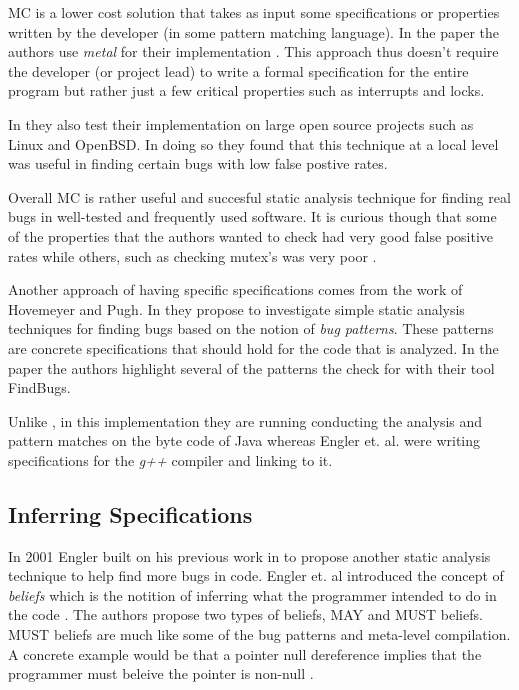 \documentclass[10pt,oneside]{IEEEtran}
\begin{document}
MC is a lower cost solution that takes as input some specifications or properties written by the developer (in some pattern matching language). In the paper the authors use \textit{metal} for their implementation \cite{5}. This approach thus doesn't require the developer (or project lead) to write a formal specification for the entire program but rather just a few critical properties such as interrupts and locks.

In \cite{5} they also test their implementation on large open source projects such as Linux and OpenBSD. In doing so they found that this technique at a local level was useful in finding certain bugs with low false postive rates.


Overall MC is rather useful and succesful static analysis technique for finding real bugs in well-tested and frequently used software. It is curious though that some of the properties that the authors wanted to check had very good false positive rates while others, such as checking mutex's was very poor \cite{5}.

Another approach of having specific specifications comes from the work of Hovemeyer and Pugh. In \cite{6} they propose to investigate simple static analysis techniques for finding bugs based on the notion of \textit{bug patterns}. These patterns are concrete specifications that should hold for the code that is analyzed. In the paper the authors highlight several of the patterns the check for with their tool FindBugs.


Unlike \cite{5}, in this implementation they are running conducting the analysis and pattern matches on the byte code of Java whereas Engler et. al. were writing specifications for the \textit{g++} compiler and linking to it.
\subsection{Inferring Specifications}
In 2001 Engler built on his previous work in \cite{5} to propose another static analysis technique to help find more bugs in code. Engler et. al introduced the concept of \textit{beliefs} which is the notition of inferring what the programmer intended to do in the code \cite{7}. The authors propose two types of beliefs, MAY and MUST beliefs. MUST beliefs are much like some of the bug patterns and meta-level compilation. A concrete example would be that a pointer null dereference implies that the programmer must beleive the pointer is non-null \cite{7}.
\end{document}

